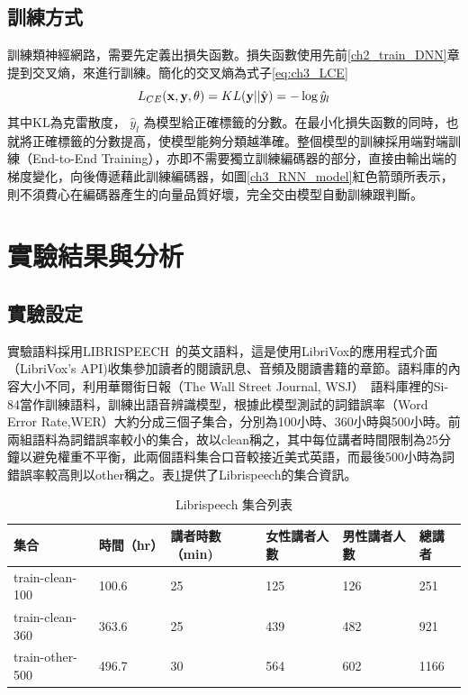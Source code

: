 \subsection{訓練方式}
訓練類神經網路，需要先定義出損失函數。損失函數使用先前\ref{ch2_train_DNN}章提到交叉熵，來進行訓練。簡化的交叉熵為式子\ref{eq:ch3_LCE}
\begin{equation} 
\label{eq:ch3_LCE}
L_{CE}(\bold{x} , \bold{y} , \theta) = KL( \bold{y} ||\hat{\bold {y}} )  = - \log \hat{y}_{l} 
\end{equation}
其中KL為克雷散度， $ \hat{y}_{l} $ 為模型給正確標籤的分數。在最小化損失函數的同時，也就將正確標籤的分數提高，使模型能夠分類越準確。整個模型的訓練採用端對端訓練（End-to-End
Training），亦即不需要獨立訓練編碼器的部分，直接由輸出端的梯度變化，向後傳遞藉此訓練編碼器，如圖\ref{ch3_RNN_model}紅色箭頭所表示，則不須費心在編碼器產生的向量品質好壞，完全交由模型自動訓練跟判斷。
\section{實驗結果與分析}
\subsection{實驗設定}
 實驗語料採用LIBRISPEECH~\cite{panayotov2015librispeech}的英文語料，這是使用LibriVox的應用程式介面（LibriVox's
 API)收集參加讀者的閱讀訊息、音頻及閱讀書籍的章節。語料庫的內容大小不同，利用華爾街日報（The
 Wall Street Journal,
 WSJ）~\cite{paul1992design}語料庫裡的Si-84當作訓練語料，訓練出語音辨識模型，根據此模型測試的詞錯誤率（Word
 Error
 Rate,WER）大約分成三個子集合，分別為100小時、360小時與500小時。前兩組語料為詞錯誤率較小的集合，故以clean稱之，其中每位講者時間限制為25分鐘以避免權重不平衡，此兩個語料集合口音較接近美式英語，而最後500小時為詞錯誤率較高則以other稱之。表\ref{table:ex_info}提供了Librispeech的集合資訊。
 \begin{table}[ht]
	 \caption{Librispeech 集合列表}
	 \label{table:ex_info}
 \begin{tabular}[t]{|l|l|l|l|l|l|}
	 \hline
	 集合 & 時間（hr） & 講者時數（min) &女性講者人數&男性講者人數&總講者\\
	 \hline
	 train-clean-100   & 100.6   & 25 & 125 & 126 & 251 \\
	 \hline
	 train-clean-360   & 363.6   & 25 & 439 & 482 & 921 \\
	 \hline
	 train-other-500   & 496.7   & 30 & 564 & 602 & 1166 \\
	 \hline
 \end{tabular}
 \end{table}
 

